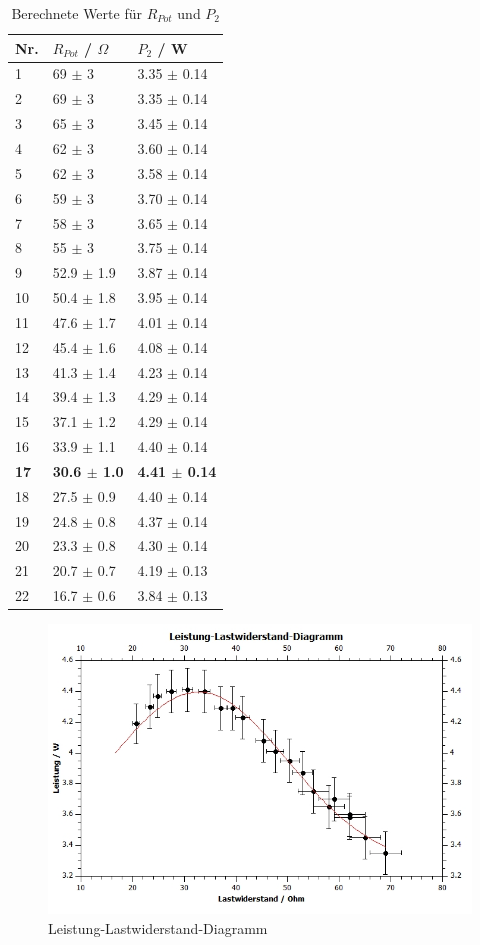 \documentclass[12pt,a4paper,twoside]{article}
\begin{document}
\begin{table}[H]
    \centering
    \caption{Berechnete Werte für $R_{Pot}$ und $P_{2}$}
    \label{tab:berechnungenRPotP2AW}
    \begin{tabular}{| l | l | l |}
        \hline
        Nr.  & $R_{Pot}$ / $\Omega$ & $P_{2}$ / W \\
        \hline
        1 & 69 $\pm$ 3 & 3.35 $\pm$ 0.14 \\
        2 & 69 $\pm$ 3 & 3.35 $\pm$ 0.14 \\
        3 & 65 $\pm$ 3 & 3.45 $\pm$ 0.14 \\
        4 & 62 $\pm$ 3 & 3.60 $\pm$ 0.14 \\
        5 & 62 $\pm$ 3 & 3.58 $\pm$ 0.14 \\
        6 & 59 $\pm$ 3 & 3.70 $\pm$ 0.14 \\
        7 & 58 $\pm$ 3 & 3.65 $\pm$ 0.14 \\
        8 & 55 $\pm$ 3 & 3.75 $\pm$ 0.14 \\
        9 & 52.9 $\pm$ 1.9 & 3.87 $\pm$ 0.14 \\
        10 & 50.4 $\pm$ 1.8 & 3.95 $\pm$ 0.14 \\
        11 & 47.6 $\pm$ 1.7 & 4.01 $\pm$ 0.14 \\
        12 & 45.4 $\pm$ 1.6 & 4.08 $\pm$ 0.14 \\
        13 & 41.3 $\pm$ 1.4 & 4.23 $\pm$ 0.14 \\
        14 & 39.4 $\pm$ 1.3 & 4.29 $\pm$ 0.14 \\
        15 & 37.1 $\pm$ 1.2 & 4.29 $\pm$ 0.14 \\
        16 & 33.9 $\pm$ 1.1 & 4.40 $\pm$ 0.14 \\
        \textbf{17} & \textbf{30.6 $\pm$ 1.0} & \textbf{4.41 $\pm$ 0.14} \\
        18 & 27.5 $\pm$ 0.9 & 4.40 $\pm$ 0.14 \\
        19 & 24.8 $\pm$ 0.8 & 4.37 $\pm$ 0.14 \\
        20 & 23.3 $\pm$ 0.8 & 4.30 $\pm$ 0.14 \\
        21 & 20.7 $\pm$ 0.7 & 4.19 $\pm$ 0.13 \\
        22 & 16.7 $\pm$ 0.6 & 3.84 $\pm$ 0.13 \\
        \hline
    \end{tabular}
\end{table}

\begin{figure}[H]
    \centering
    \includegraphics[width=0.6\linewidth, angle=0]{nudes/Leistung-Lastwiderstand-Diagramm.jpg}
    \caption{Leistung-Lastwiderstand-Diagramm}
    \label{fig:LeistungLastwiderstandDiagrammAW}
\end{figure}
\end{document}

